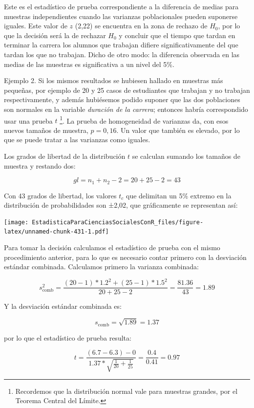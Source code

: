 \documentclass[]{book}
\let\rmarkdownfootnote\footnote%
\def\footnote{\protect\rmarkdownfootnote}
\begin{document}
Este es el estadístico de prueba correspondiente a la diferencia de
medias para muestras independientes cuando las varianzas poblacionales
pueden suponerse iguales. Este valor de \(z\) (2,22) se encuentra en la zona de rechazo de \(H_{0}\), por lo que la decisión será la de rechazar \(H_{0}\) y concluir que el tiempo que tardan en terminar la carrera los alumnos que trabajan difiere significativamente del que tardan los que no trabajan. Dicho de otro modo: la diferencia observada en las medias de las muestras es significativa a un nivel del 5\%.

Ejemplo 2. Si los mismos resultados se hubiesen hallado en muestras más pequeñas,
por ejemplo de 20 y 25 casos de estudiantes que trabajan y no trabajan
respectivamente, y además hubiésemos podido suponer que las dos
poblaciones son normales en la variable \emph{duración de la carrera};
entonces habría correspondido usar una prueba \(t\) \footnote{Recordemos que la distribución normal vale para muestras grandes, por el Teorema Central del Límite.}. La prueba de
homogeneidad de varianzas da, con esos nuevos tamaños de muestra,
\(p = 0,16\). Un valor que también es elevado, por lo que se puede tratar
a las varianzas como iguales.

Los grados de libertad de la distribución \(t\) se calculan sumando los
tamaños de muestra y restando dos:

\[gl = n_{1} + n_{2} - 2 = 20 + 25 - 2 = 43\]

Con 43 grados de libertad, los valores \(t_{c}\) que delimitan un 5\% extremo en la distribución de probabilidades son ±2,02, que gráficamente se
representan así:

\texttt{[image: EstadisticaParaCienciasSocialesConR\_files/figure-latex/unnamed-chunk-431-1.pdf]}

Para tomar la decisión calculamos el estadístico de prueba con el mismo
procedimiento anterior, para lo que es necesario contar primero con la
desviación estándar combinada. Calculamos primero la varianza combinada:

\[s_{\text{comb}}^{2} = \frac{\left( 20 - 1 \right)*{1.2}^{2} + \left( 25 - 1 \right)*{1.5}^{2}}{20 + 25 - 2} = \frac{81.36}{43} = 1.89\]

Y la desviación estándar combinada es:

\[s_{\text{comb}} = \sqrt{1.89} = 1.37\]

por lo que el estadístico de prueba resulta:

\[t = \frac{\left( 6.7 - 6.3 \right) - 0}{1.37*\sqrt{\frac{1}{20} + \frac{1}{25}}} = \frac{0.4}{0.41} = 0.97\]
\end{document}
